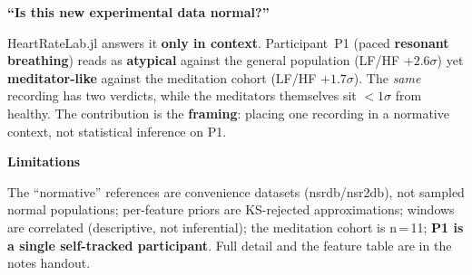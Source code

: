 \documentclass[fontsize=20pt]{scrartcl}
\begin{document}
\begin{tcolorbox}[enhanced,colback=jcgreen,colframe=jcgreen,arc=6mm,
     fontupper=\color{white},drop fuzzy shadow=black!45,top=5mm,bottom=5mm,left=9mm,right=9mm]
  \begin{minipage}[t]{0.605\linewidth}
    {\bfseries\LARGE ``Is this new experimental data normal?''}\par\vspace{2.5mm}
    {\large HeartRateLab.jl answers it \textbf{only in context}. Participant~P1 (paced
    \textbf{resonant breathing}) reads as \textbf{atypical} against the general population
    (LF/HF $+2.6\sigma$) yet \textbf{meditator-like} against the meditation cohort
    (LF/HF $+1.7\sigma$). The \emph{same} recording has two verdicts, while the meditators
    themselves sit $<\!1\sigma$ from healthy. The contribution is the \textbf{framing}:
    placing one recording in a normative context, not statistical inference on P1.}
  \end{minipage}\hfill
  \begin{minipage}[t]{0.355\linewidth}
    {\color{white}\bfseries\Large Limitations}\par\vspace{2.5mm}
    {\normalsize\color{white!90} The ``normative'' references are convenience datasets
    (nsrdb/nsr2db), not sampled normal populations; per-feature priors are KS-rejected
    approximations; windows are correlated (descriptive, not inferential); the meditation
    cohort is n\,=\,11; \textbf{P1 is a single self-tracked participant}. Full detail and the
    feature table are in the notes handout.}
  \end{minipage}
\end{tcolorbox}
\end{document}
